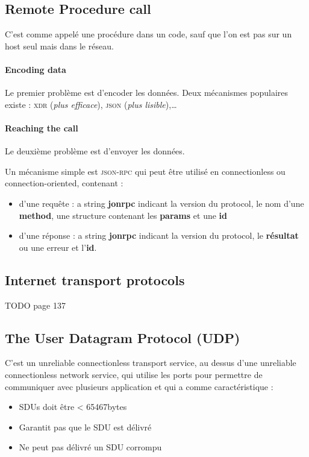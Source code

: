 \subsection{Remote Procedure call}
C'est comme appelé une procédure dans un code, sauf que l'on est pas sur
un host seul mais dans le réseau.

\paragraph{Encoding data} Le premier problème est d'encoder les données.
Deux mécanismes populaires existe :
\textsc{xdr} (\textit{plus efficace}), \textsc{json} (\textit{plus lisible}),\ldots

\paragraph{Reaching the call}
Le deuxième problème est d'envoyer les données.

Un mécanisme simple est \textsc{json-rpc} qui peut être utilisé en connectionless ou
connection-oriented, contenant :
\begin{itemize} 
    \item d'une requête : a string \textbf{jonrpc} indicant la version du protocol,
        le nom d'une \textbf{method}, une structure contenant les \textbf{params}
        et une \textbf{id}
    \item d'une réponse : a string \textbf{jonrpc} indicant la version du protocol,
        le \textbf{résultat} ou une erreur et l'\textbf{id}.
\end{itemize}


\subsection{Internet transport protocols}
TODO page 137

\subsection{The User Datagram Protocol (UDP)}

C'est un unreliable connectionless transport service, au dessus d'une unreliable
connectionless network service, qui utilise les ports
pour permettre de communiquer avec plusieurs application et qui a comme
caractéristique :
\begin{itemize}
    \item SDUs doit être < 65467bytes
    \item Garantit pas que le SDU est délivré
    \item Ne peut pas délivré un SDU corrompu
\end{itemize}

